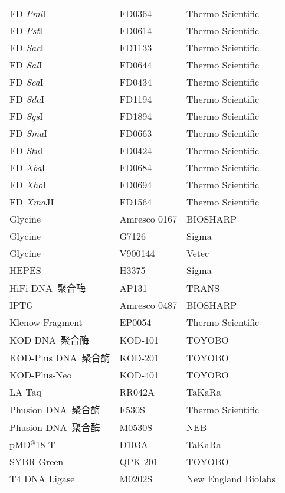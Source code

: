 \begin{longtable}{lll @{}}
FD \textit{Pml}I	&	FD0364	&	Thermo Scientific	\\
FD \textit{Pst}I	&	FD0614	&	Thermo Scientific	\\
FD \textit{Sac}I	&	FD1133	&	Thermo Scientific	\\
FD \textit{Sal}I	&	FD0644	&	Thermo Scientific	\\
FD \textit{Sca}I	&	FD0434	&	Thermo Scientific	\\
FD \textit{Sda}I	&	FD1194	&	Thermo Scientific	\\
FD \textit{Sgs}I	&	FD1894	&	Thermo Scientific	\\
FD \textit{Sma}I	&	FD0663	&	Thermo Scientific	\\
FD \textit{Stu}I	&	FD0424	&	Thermo Scientific	\\
FD \textit{Xba}I	&	FD0684	&	Thermo Scientific	\\
FD \textit{Xho}I	&	FD0694	&	Thermo Scientific	\\
FD \textit{Xma}JI	&	FD1564	&	Thermo Scientific	\\
Glycine             &   Amresco 0167& BIOSHARP          \\
Glycine             &   G7126   &   Sigma               \\
Glycine             &   V900144 &   Vetec               \\
HEPES               &   H3375   &   Sigma               \\
HiFi DNA\ 聚合酶    &   AP131   &   TRANS               \\
IPTG                &   Amresco 0487 & BIOSHARP         \\
Klenow Fragment	    &	EP0054	&	Thermo Scientific	\\
KOD DNA\ 聚合酶     &   KOD-101 &   TOYOBO              \\
KOD-Plus DNA\ 聚合酶&   KOD-201 &   TOYOBO              \\
KOD-Plus-Neo        &   KOD-401 &   TOYOBO              \\
LA Taq              &   RR042A  &   TaKaRa              \\
Phusion DNA\ 聚合酶 &   F530S   &   Thermo Scientific   \\
Phusion DNA\ 聚合酶 &   M0530S  &   NEB                 \\
pMD$^\text{\textregistered}$18-T&   D103A               & TaKaRa\\
SYBR Green          &   QPK-201 & TOYOBO\\
T4 DNA Ligase	    &	M0202S	&	New England Biolabs	\\

\end{longtable}
